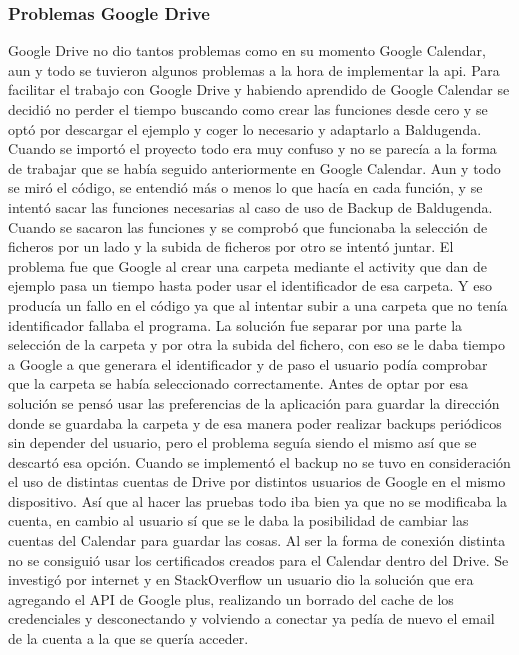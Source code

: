 \subsubsection{Problemas Google Drive}
\label{subsubsecc:Problemas Google Drive}

Google Drive no dio tantos problemas como en su momento Google Calendar, aun y todo se tuvieron algunos problemas a la hora de implementar la api.
Para facilitar el trabajo con Google Drive y habiendo aprendido de Google Calendar se decidió no perder el tiempo buscando como crear las funciones desde cero y se optó por descargar el ejemplo y coger lo necesario y adaptarlo a Baldugenda.
Cuando se importó el proyecto todo era muy confuso y no se parecía a la forma de trabajar que se había seguido anteriormente en Google Calendar.
Aun y todo se miró el código, se entendió más o menos lo que hacía en cada función,  y se intentó sacar las funciones necesarias al caso de uso de Backup de Baldugenda.
Cuando se sacaron las funciones y se comprobó que funcionaba la selección de ficheros por un lado y la subida de ficheros por otro se intentó juntar.
El problema fue que Google al crear una carpeta mediante el activity que dan de ejemplo pasa un tiempo hasta poder usar el identificador de esa carpeta. Y eso producía un fallo en el código ya que al intentar subir a una carpeta que no tenía identificador fallaba el programa.
La solución fue separar por una parte la selección de la carpeta y por otra la subida del fichero, con eso se le daba tiempo a Google a que generara el identificador y de paso el usuario podía comprobar que la carpeta se había seleccionado correctamente.
Antes de optar por esa solución se pensó usar las preferencias de la aplicación para guardar la dirección donde se guardaba la carpeta y de esa manera poder realizar backups periódicos sin depender del usuario, pero el problema seguía siendo el mismo así que se descartó esa opción.
Cuando se implementó el backup no se tuvo en consideración el uso de distintas cuentas de Drive por distintos usuarios de Google en el mismo dispositivo. Así que al hacer las pruebas todo iba bien ya que no se modificaba la cuenta, en cambio al usuario sí que se le daba la posibilidad de cambiar las cuentas del Calendar para guardar las cosas. Al ser la forma de conexión distinta no se consiguió usar los certificados creados para el Calendar dentro del Drive.
Se investigó por internet y en StackOverflow un usuario dio la solución que era agregando el API de Google plus, realizando un borrado del cache de los credenciales y desconectando y volviendo a conectar ya pedía de nuevo el email de la cuenta a la que se quería acceder.

